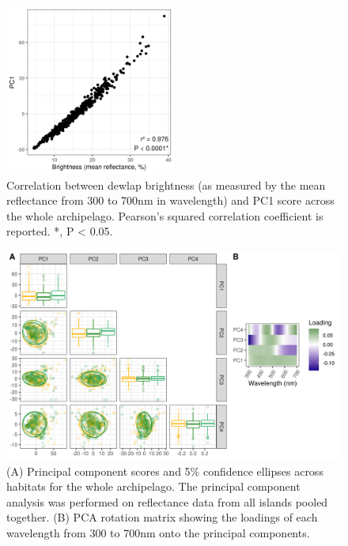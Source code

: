 \begin{figure}[H]
	\centering
	\includegraphics[width=0.5\textwidth]{suppfigures/figure_brightness_pooled.png}
	\caption{Correlation between dewlap brightness (as measured by the mean reflectance from 300 to 700nm in wavelength) and PC1 score across the whole archipelago. Pearson's squared correlation coefficient is reported. *, P < 0.05.}
	\label{supfig:brightness_pooled}
\end{figure}

\begin{figure}[H]
	\centering
	\includegraphics[width = \textwidth]{suppfigures/figure_pooled.png}
	\caption{(A) Principal component scores and 5\% confidence ellipses across habitats for the whole archipelago. The principal component analysis was performed on reflectance data from all islands pooled together. (B) PCA rotation matrix showing the loadings of each wavelength from 300 to 700nm onto the principal components.}
	\label{supfig:pooled}
\end{figure}

